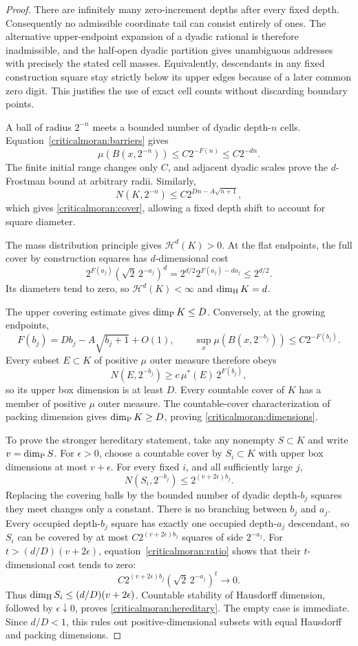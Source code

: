 \begin{proof}
There are infinitely many zero-increment depths after every fixed
depth. Consequently no admissible coordinate tail can consist
entirely of ones. The alternative upper-endpoint expansion of a
dyadic rational is therefore inadmissible, and the half-open dyadic
partition gives unambiguous addresses with precisely the stated
cell masses. Equivalently, descendants in any fixed construction
square stay strictly below its upper edges because of a later
common zero digit. This justifies the use of exact cell counts
without discarding boundary points.

A ball of radius \(2^{-n}\) meets a bounded number of dyadic
depth-\(n\) cells. Equation~\eqref{criticalmoran:barriers} gives
\[
 \mu(B(x,2^{-n}))\le C2^{-F(n)}\le C2^{-dn}.
\]
The finite initial range changes only \(C\), and adjacent dyadic
scales prove the \(d\)-Frostman bound at arbitrary radii.
Similarly,
\[
 N(K,2^{-n})\le C2^{Dn-A\sqrt{n+1}},
\]
which gives \eqref{criticalmoran:cover}, allowing a fixed depth
shift to account for square diameter.

The mass distribution principle gives \(\mathcal H^d(K)>0\).
At the flat endpoints, the full cover by construction squares has
\(d\)-dimensional cost
\[
 2^{F(a_j)}(\sqrt2\,2^{-a_j})^d
 =2^{d/2}2^{F(a_j)-da_j}\le2^{d/2}.
\]
Its diameters tend to zero, so \(\mathcal H^d(K)<\infty\) and
\(\dim_{\mathrm H} K=d\).

The upper covering estimate gives \(\dim_{\mathrm P} K\le D\). Conversely,
at the growing endpoints,
\[
 F(b_j)=Db_j-A\sqrt{b_j+1}+O(1),\qquad
 \sup_x\mu(B(x,2^{-b_j}))\le C2^{-F(b_j)}.
\]
Every subset \(E\subset K\) of positive \(\mu\) outer measure
therefore obeys
\[
 N(E,2^{-b_j})\ge c\,\mu^*(E)\,2^{F(b_j)},
\]
so its upper box dimension is at least \(D\). Every countable
cover of \(K\) has a member of positive \(\mu\) outer measure.
The countable-cover characterization of packing dimension gives
\(\dim_{\mathrm P} K\ge D\), proving \eqref{criticalmoran:dimensions}.

To prove the stronger hereditary statement, take any nonempty
\(S\subset K\) and write \(v=\dim_{\mathrm P} S\). For \(\epsilon>0\), choose
a countable cover by \(S_i\subset K\) with upper box dimensions
at most \(v+\epsilon\). For every fixed \(i\), and all sufficiently
large \(j\),
\[
 N(S_i,2^{-b_j})\le2^{(v+2\epsilon)b_j}.
\]
Replacing the covering balls by the bounded number of dyadic
depth-\(b_j\) squares they meet changes only a constant. There is
no branching between \(b_j\) and \(a_j\). Every occupied
depth-\(b_j\) square has exactly one occupied depth-\(a_j\)
descendant, so \(S_i\) can be covered by at most
\(C2^{(v+2\epsilon)b_j}\) squares of side \(2^{-a_j}\).
For \(t>(d/D)(v+2\epsilon)\), equation~\eqref{criticalmoran:ratio}
shows that their \(t\)-dimensional cost tends to zero:
\[
 C2^{(v+2\epsilon)b_j}(\sqrt2\,2^{-a_j})^t\longrightarrow0.
\]
Thus \(\dim_{\mathrm H} S_i\le(d/D)(v+2\epsilon)\). Countable stability of
Hausdorff dimension, followed by \(\epsilon\downarrow0\), proves
\eqref{criticalmoran:hereditary}. The empty case is immediate.
Since \(d/D<1\), this rules out positive-dimensional subsets with
equal Hausdorff and packing dimensions.


\end{proof}
